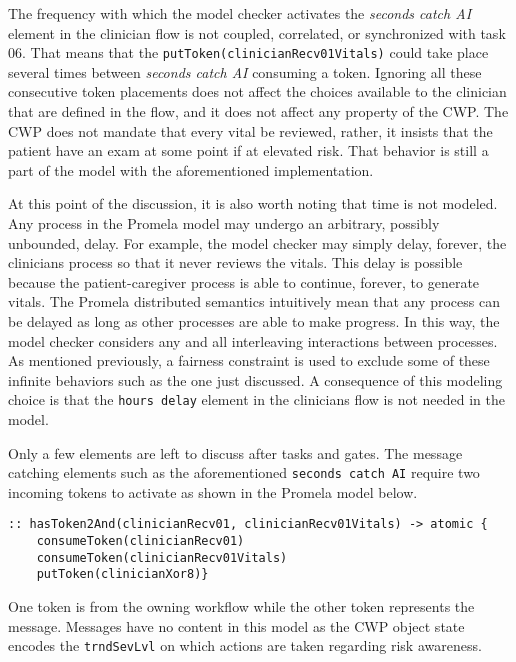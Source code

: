 The frequency with which the model checker activates the \emph{seconds catch AI} element in the clinician flow is not coupled, correlated, or synchronized with task 06. That means that the \texttt{putToken(clinicianRecv01Vitals)} could take place several times between \emph{seconds catch AI} consuming a token. Ignoring all these consecutive token placements does not affect the choices available to the clinician that are defined in the flow, and it does not affect any property of the CWP. The CWP does not mandate that every vital be reviewed, rather, it insists that the patient have an exam at some point if at elevated risk. That behavior is still a part of the model with the aforementioned implementation.

At this point of the discussion, it is also worth noting that time is not modeled. Any process in the Promela model may undergo an arbitrary, possibly unbounded, delay. For example, the model checker may simply delay, forever, the clinicians process so that it never reviews the vitals. This delay is possible because the patient-caregiver process is able to continue, forever, to generate vitals. The Promela distributed semantics intuitively mean that any process can be delayed as long as other processes are able to make progress. In this way, the model checker considers any and all interleaving interactions between processes. As mentioned previously, a fairness constraint is used to exclude some of these infinite behaviors such as the one just discussed. A consequence of this modeling choice is that the \texttt{hours delay} element in the clinicians flow is not needed in the model.

Only a few elements are left to discuss after tasks and gates. The message catching elements such as the aforementioned \texttt{seconds catch AI} require two incoming tokens to activate as shown in the Promela model below.
%
{\small
\begin{lstlisting}[style=myPromela]
:: hasToken2And(clinicianRecv01, clinicianRecv01Vitals) -> atomic {
    consumeToken(clinicianRecv01)
    consumeToken(clinicianRecv01Vitals)
    putToken(clinicianXor8)}
\end{lstlisting}
}
%
\noindent One token is from the owning workflow while the other token represents the message. Messages have no content in this model as the CWP object state encodes the \texttt{trndSevLvl} on which actions are taken regarding risk awareness.

